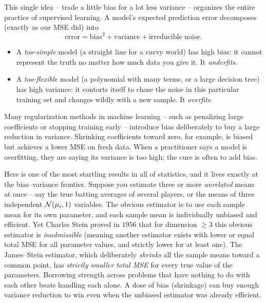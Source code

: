\begin{applicationbox}
This single idea -- trade a little bias for a lot less variance -- organizes the
entire practice of supervised learning. A model's expected prediction error
decomposes (exactly as our MSE did) into
\[
  \text{error} = \text{bias}^2 + \text{variance} + \text{irreducible noise}.
\]
\begin{itemize}
\item A \emph{too-simple} model (a straight line for a curvy world) has high
  bias: it cannot represent the truth no matter how much data you give it. It
  \emph{underfits}.
\item A \emph{too-flexible} model (a polynomial with many terms, or a large decision tree) has high variance: it contorts itself to chase the noise in this
  particular training set and changes wildly with a new sample. It
  \emph{overfits}.
\end{itemize}
Many regularization methods in machine learning -- such as penalizing large coefficients or stopping training early -- introduce bias deliberately to buy a large reduction in variance. Shrinking coefficients toward zero, for example, is biased but achieves a lower MSE on fresh data. When a
practitioner says a model is overfitting, they are saying its variance is too
high; the cure is often to add bias.
\end{applicationbox}

\begin{paradoxbox}
Here is one of the most startling results in all of statistics, and it lives
exactly at the bias--variance frontier. Suppose you estimate three or more
\emph{unrelated} means at once -- say the true batting averages of several
players, or the means of three independent $\mathcal{N}(\mu_i,1)$ variables. The
obvious estimator is to use each sample mean for its own parameter, and each
sample mean is individually unbiased and efficient. Yet Charles Stein proved in
$1956$ that for dimension $\ge 3$ this obvious estimator is \emph{inadmissible} (meaning another estimator exists with lower or equal total MSE for all parameter values, and strictly lower for at least one). The James--Stein estimator, which deliberately \emph{shrinks} all the sample
means toward a common point, has \emph{strictly smaller total MSE} for every
true value of the parameters. Borrowing strength across problems that have
nothing to do with each other beats handling each alone. A dose of bias (shrinkage) can buy enough
variance reduction to win even when the unbiased estimator was already efficient.
\end{paradoxbox}

